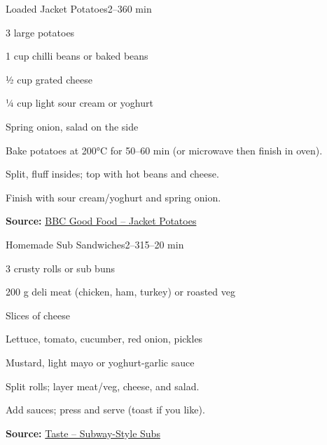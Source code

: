\begin{recipebox}{Loaded Jacket Potatoes}{2--3}{60 min}
\begin{ingredients}
  \item 3 large potatoes
  \item 1 cup chilli beans or baked beans
  \item ½ cup grated cheese
  \item ¼ cup light sour cream or yoghurt
  \item Spring onion, salad on the side
\end{ingredients}
\begin{method}
  \item Bake potatoes at 200°C for 50--60 min (or microwave then finish in oven).
  \item Split, fluff insides; top with hot beans and cheese.
  \item Finish with sour cream/yoghurt and spring onion.
\end{method}
\textbf{Source:} \href{https://www.bbcgoodfood.com/recipes/jacket-potatoes}{BBC Good Food – Jacket Potatoes}
\end{recipebox}

\begin{recipebox}{Homemade Sub Sandwiches}{2--3}{15–20 min}
\begin{ingredients}
  \item 3 crusty rolls or sub buns
  \item 200 g deli meat (chicken, ham, turkey) or roasted veg
  \item Slices of cheese
  \item Lettuce, tomato, cucumber, red onion, pickles
  \item Mustard, light mayo or yoghurt-garlic sauce
\end{ingredients}
\begin{method}
  \item Split rolls; layer meat/veg, cheese, and salad.
  \item Add sauces; press and serve (toast if you like).
\end{method}
\textbf{Source:} \href{https://www.taste.com.au/recipes/subway-style-subs/}{Taste – Subway-Style Subs}
\end{recipebox}

